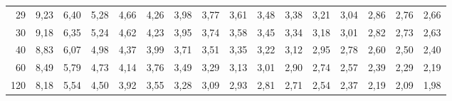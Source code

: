 \documentclass[a4paper,10pt]{extarticle}
\begin{document}
\begin{center}
\begin{tabular}{r|rrrrrrrrrrrrrrr}
29 & 9,23 & 6,40 & 5,28 & 4,66 & 4,26 & 3,98 & 3,77 & 3,61 & 3,48 & 3,38 & 3,21 & 3,04 & 2,86 & 2,76 & 2,66\\
30 & 9,18 & 6,35 & 5,24 & 4,62 & 4,23 & 3,95 & 3,74 & 3,58 & 3,45 & 3,34 & 3,18 & 3,01 & 2,82 & 2,73 & 2,63\\
40 & 8,83 & 6,07 & 4,98 & 4,37 & 3,99 & 3,71 & 3,51 & 3,35 & 3,22 & 3,12 & 2,95 & 2,78 & 2,60 & 2,50 & 2,40\\
60 & 8,49 & 5,79 & 4,73 & 4,14 & 3,76 & 3,49 & 3,29 & 3,13 & 3,01 & 2,90 & 2,74 & 2,57 & 2,39 & 2,29 & 2,19\\
120 & 8,18 & 5,54 & 4,50 & 3,92 & 3,55 & 3,28 & 3,09 & 2,93 & 2,81 & 2,71 & 2,54 & 2,37 & 2,19 & 2,09 & 1,98\\
\end{tabular}
\end{center}
\end{document}
